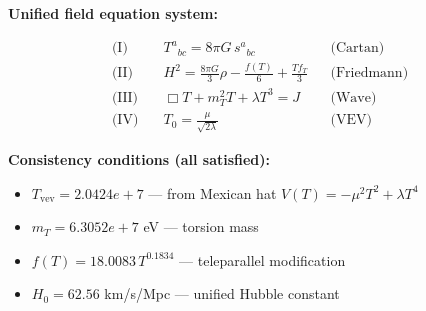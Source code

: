 
\textbf{Unified field equation system:}

\begin{align}
  \text{(I)} \quad & T^a{}_{bc} = 8\pi G \, s^a{}_{bc} && \text{(Cartan)} \\
  \text{(II)} \quad & H^2 = \frac{8\pi G}{3}\rho - \frac{f(T)}{6} + \frac{Tf_T}{3} && \text{(Friedmann)} \\
  \text{(III)} \quad & \Box T + m_T^2 T + \lambda T^3 = J && \text{(Wave)} \\
  \text{(IV)} \quad & T_0 = \frac{\mu}{\sqrt{2\lambda}} && \text{(VEV)}
\end{align}

\textbf{Consistency conditions (all satisfied):}
\begin{itemize}
  \item $T_{\text{vev}} = 2.0424e+7$ — from Mexican hat $V(T) = -\mu^2 T^2 + \lambda T^4$
  \item $m_T = 6.3052e+7$ eV — torsion mass
  \item $f(T) = 18.0083 \, T^{0.1834}$ — teleparallel modification
  \item $H_0 = 62.56$ km/s/Mpc — unified Hubble constant
\end{itemize}